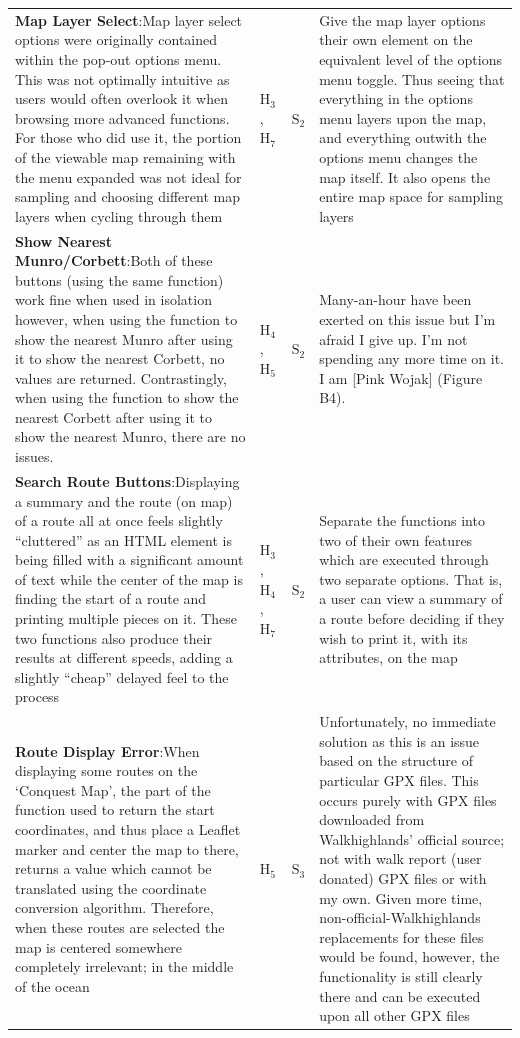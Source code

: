 \documentclass[11pt, english]{article}
\begin{document}
\begin{center}
\begin{longtable}{p{7.5cm}p{0.5cm}p{0.5cm}p{4cm}}
		\textbf{Map Layer Select}:\newline Map layer select options were originally contained within the pop-out options menu. This was not optimally intuitive as users would often overlook it when browsing more advanced functions. For those who did use it, the portion of the viewable map remaining with the menu expanded was not ideal for sampling and choosing different map layers when cycling through them & $\mathrm{H_{3}}$, $\mathrm{H_{7}}$ & $\mathrm{S_{2}}$ & Give the map layer options their own element on the equivalent level of the options menu toggle. Thus seeing that everything in the options menu layers upon the map, and everything outwith the options menu changes the map itself. It also opens the entire map space for sampling layers\\
		\textbf{Show Nearest Munro/Corbett}:\newline Both of these buttons (using the same function) work fine when used in isolation however, when using the function to show the nearest Munro after using it to show the nearest Corbett, no values are returned. Contrastingly, when using the function to show the nearest Corbett after using it to show the nearest Munro, there are no issues. & $\mathrm{H_{4}}$, $\mathrm{H_{5}}$ & $\mathrm{S_{2}}$ & Many-an-hour have been exerted on this issue but I'm afraid I give up. I'm not spending any more time on it. I am [Pink Wojak] (Figure B4).\\
		\textbf{Search Route Buttons}:\newline Displaying a summary and the route (on map) of a route all at once feels slightly ``cluttered'' as an HTML element is being filled with a significant amount of text while the center of the map is finding the start of a route and printing multiple pieces on it. These two functions also produce their results at different speeds, adding a slightly ``cheap'' delayed feel to the process & $\mathrm{H_{3}}$, $\mathrm{H_{4}}$, $\mathrm{H_{7}}$ & $\mathrm{S_{2}}$ & Separate the functions into two of their own features which are executed through two separate options. That is, a user can view a summary of a route before deciding if they wish to print it, with its attributes, on the map\\
		\textbf{Route Display Error}:\newline When displaying some routes on the `Conquest Map', the part of the function used to return the start coordinates, and thus place a Leaflet marker and center the map to there, returns a value which cannot be translated using the coordinate conversion algorithm. Therefore, when these routes are selected the map is centered somewhere completely irrelevant; in the middle of the ocean & $\mathrm{H_{5}}$ & $\mathrm{S_{3}}$ & Unfortunately, no immediate solution as this is an issue based on the structure of particular GPX files. This occurs purely with GPX files downloaded from Walkhighlands' official source; not with walk report (user donated) GPX files or with my own. Given more time, non-official-Walkhighlands replacements for these files would be found, however, the functionality is still clearly there and can be executed upon all other GPX files\\

\end{longtable}
\end{center}
\end{document}
